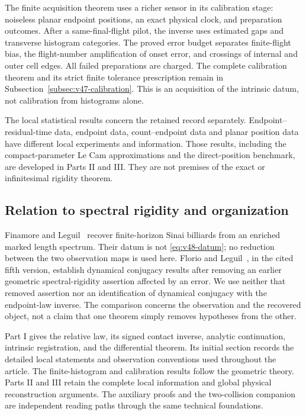 The finite acquisition theorem uses a richer sensor in its calibration
stage: noiseless planar endpoint positions, an exact physical clock, and
preparation outcomes.  After a same-final-flight pilot, the inverse uses
estimated gaps and transverse histogram categories.  The proved error
budget separates finite-flight bias, the flight-number amplification of
onset error, and crossings of internal and outer cell edges.  All failed
preparations are charged.  The complete calibration theorem and its
strict finite tolerance prescription remain in
Subsection~\ref{subsec:v47-calibration}.  This is an acquisition of
the intrinsic datum, not calibration from histograms alone.

The local statistical results concern the retained record separately.
Endpoint--residual-time data, endpoint data, count--endpoint data and
planar position data have different local experiments and information.
Those results, including the compact-parameter Le Cam approximations and
the direct-position benchmark, are developed in Parts II and III.  They
are not premises of the exact or infinitesimal rigidity theorem.

\subsection{Relation to spectral rigidity and organization}

Finamore and Leguil~\cite{FinamoreLeguil} recover finite-horizon Sinai
billiards from an enriched marked length spectrum.  Their datum is not
\eqref{eq:v48-datum}; no reduction between the two observation maps is
used here.  Florio and Leguil~\cite{FlorioLeguil}, in the cited fifth
version, establish dynamical conjugacy results after removing an earlier
geometric spectral-rigidity assertion affected by an error.  We use
neither that removed assertion nor an identification of dynamical
conjugacy with the endpoint-law inverse.  The comparison concerns the
observation and the recovered object, not a claim that one theorem
simply removes hypotheses from the other.

Part I gives the relative law, its signed contact inverse, analytic
continuation, intrinsic registration, and the differential theorem.  Its
initial section records the detailed local statements and observation
conventions used throughout the article.  The finite-histogram and
calibration results follow the geometric theory.  Parts II and III retain
the complete local information and global physical reconstruction
arguments.  The auxiliary proofs and the two-collision companion are
independent reading paths through the same technical foundations.
